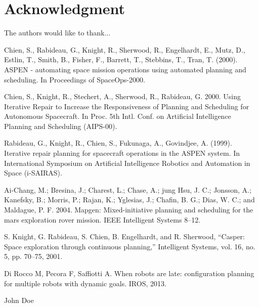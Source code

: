 \documentclass[conference]{IEEEtran}
\begin{document}
\section*{Acknowledgment}
The authors would like to thank...


\begin{thebibliography}{1}

Chien, S., Rabideau, G., Knight, R., Sherwood, R., Engelhardt, E., Mutz, D., Estlin, T., Smith, B., Fisher, F., Barrett, T., Stebbins, T., Tran, T. (2000). ASPEN - automating space mission operations using automated planning and scheduling. In Proceedings of SpaceOps-2000.

Chien, S., Knight, R., Stechert, A., Sherwood, R., Rabideau, G. 2000. Using Iterative Repair to Increase the Responsiveness of Planning and Scheduling for Autonomous Spacecraft. In Proc. 5th Intl. Conf. on Artificial Intelligence Planning and Scheduling (AIPS-00).

Rabideau, G., Knight, R., Chien, S., Fukunaga, A., Govindjee, A. (1999). Iterative repair planning for spacecraft operations in the ASPEN system. In International Symposium on Artificial Intelligence Robotics and Automation in Space (i-SAIRAS).

Ai-Chang, M.; Bresina, J.; Charest, L.; Chase, A.; jung Hsu, J. C.; Jonsson, A.; Kanefsky, B.; Morris, P.; Rajan, K.; Yglesias, J.; Chafin, B. G.; Dias, W. C.; and Maldague, P. F. 2004. Mapgen: Mixed-initiative planning and scheduling for the mars exploration rover mission. IEEE Intelligent Systems 8–12.

S. Knight, G. Rabideau, S. Chien, B. Engelhardt, and R. Sherwood,
“Casper: Space exploration through continuous planning,” Intelligent
Systems, vol. 16, no. 5, pp. 70–75, 2001.

Di Rocco M, Pecora F, Saffiotti A. When robots are late: configuration planning for multiple robots with dynamic goals. IROS, 2013.


\end{thebibliography}


\begin{IEEEbiography}{John Doe}
\end{IEEEbiography}
\end{document}
